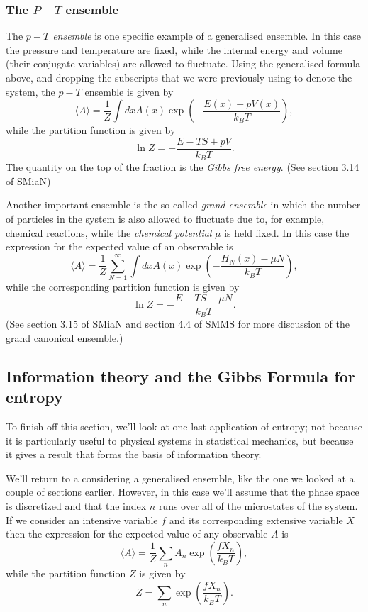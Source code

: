 \subsubsection{The $P-T$ ensemble}
The \emph{$p-T$ ensemble} is one specific example of a generalised ensemble. In this case the pressure and temperature are fixed, while the internal energy and volume (their conjugate variables) are allowed to fluctuate.
Using the generalised formula above, and dropping the subscripts that we were previously using to denote the system, the $p-T$ ensemble is given by
 \begin{equation*}
	\langle A\rangle = \frac{1}{Z}\int dxA(x)\exp\left(-\frac{E(x)+pV(x)}{k_BT}\right),
\end{equation*}
while the partition function is given by
$$
	\ln Z = -\frac{E-TS+pV}{k_BT}.
$$
The quantity on the top of the fraction is the \emph{Gibbs free energy}. (See section 3.14 of SMiaN)

Another important ensemble is the so-called \emph{grand ensemble} in which the number of particles in the system is also allowed to fluctuate due to, for example, chemical reactions, while the \emph{chemical potential} $\mu$ is held fixed. In this case the expression for the expected value of an observable is
$$
	\langle A \rangle = \frac{1}{Z} \sum_{N=1}^\infty \int dxA(x)\exp\left(-\frac{H_N(x)-\mu N}{k_BT}\right),
$$
while the corresponding partition function is given by
$$
	\ln Z = -\frac{E-TS-\mu N}{k_BT}.
$$
(See section 3.15 of SMiaN and section 4.4 of SMMS for more discussion of the grand canonical ensemble.)

\subsection{Information theory and the Gibbs Formula for entropy}
To finish off this section, we'll look at one last application of entropy; not because it is particularly useful to physical systems in statistical mechanics, but because it gives a result that forms the basis of information theory.

We'll return to a considering a generalised ensemble, like the one we looked at a couple of sections earlier. However, in this case we'll assume that the phase space is discretized and that the index $n$ runs over all of the microstates of the system. If we consider an intensive variable $f$ and its corresponding extensive variable $X$ then the expression for the expected value of any observable $A$ is
$$
	\langle A \rangle = \frac{1}{Z}\sum_n A_n\exp\left(\frac{fX_n}{k_BT}\right),
$$
while the partition function $Z$ is given by
$$
	Z =\sum_n\exp\left(\frac{fX_n}{k_BT}\right).
$$

